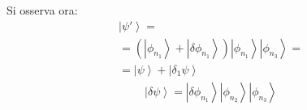 Si osserva ora:
\begin{equation}\begin{split}
\left |\psi ' \right\rangle=\\
=\left(\left |\phi _{n_1} \right\rangle+\left |\delta\phi _{n_1} \right\rangle\right)\left |\phi_{n_1}  \right\rangle\left |\phi_{n_3} \right\rangle=\\
=\left |\psi  \right\rangle+\left |\delta_1\psi  \right\rangle
\end{split}\end{equation}
\begin{equation}\begin{split}
\left |\delta\psi  \right\rangle=\left |\delta\phi_{n_1} \right\rangle\left |\phi_{n_2} \right\rangle\left |\phi_{n_3} \right\rangle
\end{split}\end{equation}

